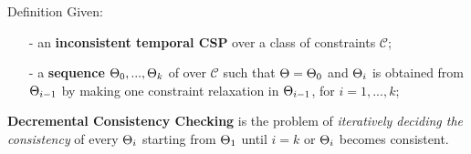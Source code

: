 \begin{frame}{Definition}
    Given:
	\begin{itemize}
		\item[-] \small{an \textbf{inconsistent temporal CSP} \CSP{} over a class of constraints $\mathcal{C}$};
		\item[-] \small{a \textbf{sequence} $\CSP{}_{0}, ..., \CSP{}_k$ of \TCSPNames{} over $\mathcal{C}$ such that $\CSP{}= \CSP{}_{0}$ and $\CSP{}_i$ is obtained from $\CSP{}_{i-1}$ by making one constraint relaxation in $\CSP{}_{i-1}$, for $i = 1, ..., k$};
	\end{itemize}
	\textbf{\color{blue} Decremental Consistency Checking} is the problem of \textit{iteratively deciding the consistency} of every $\CSP{}_i$ starting from $\CSP{}_1$ until $i = k$ or $\CSP{}_i$ becomes consistent.

\end{frame}

